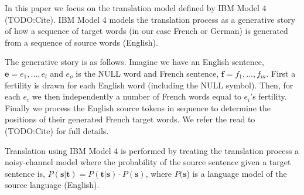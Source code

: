 In this paper we focus on the translation model defined by IBM Model 4
(TODO:Cite).  IBM Model 4 models the translation process as a
generative story of how a sequence of target words (in our case French
or German) is generated from a sequence of source words (English).

The generative story is as follows.  Imagine we have an English
sentence, $\mathbf{e} = e_1, \dots,e_l$ and $e_o$ is the NULL word and
French sentence, $\mathbf{f} = f_1, \dots, f_m$.  First a fertility is
drawn for each English word (including the NULL symbol).  Then, for
each $e_i$ we then independently a number of French words equal to
$e_i$'s fertility.  Finally we process the English source tokens in
sequence to determine the positions of their generated French target
words.  We refer the read to (TODO:Cite) for full details.

Translation using IBM Model 4 is performed by treating the translation
process a noisy-channel model where the probability of the source
sentence given a target sentence is, $P(\mathbf{s}|\mathbf{t}) =
P(\mathbf{t}|\mathbf{s}) \cdot P(\mathbf{s})$, where $P(\mathbf{s}$) is
a language model of the source language (English).

